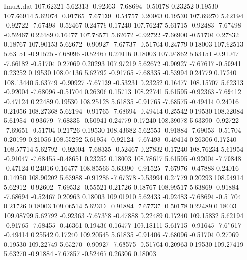 \begin{filecontents}{ImuA.dat}
 107.62321    5.62313   -0.92363   -7.68694   -0.50178    0.23252    0.19530
 107.66914    5.62074   -0.91765   -7.67139   -0.54757    0.20963    0.19530
 107.69270    5.62194   -0.92722   -7.67498   -0.52467    0.24779    0.17240
 107.76247    5.61715   -0.92483   -7.67498   -0.52467    0.22489    0.16477
 107.78571    5.62672   -0.92722   -7.66900   -0.51704    0.27832    0.18767
 107.90153    5.62672   -0.90927   -7.67737   -0.51704    0.24779    0.18003
 107.92513    5.63151   -0.91525   -7.68096   -0.52467    0.24016    0.18003
 107.94862    5.63151   -0.91047   -7.66182   -0.51704    0.27069    0.20293
 107.97219    5.62672   -0.90927   -7.67617   -0.50941    0.23252    0.19530
 108.04136    5.62792   -0.91765   -7.68335   -0.53994    0.24779    0.17240
 108.13440    5.63749   -0.90927   -7.67139   -0.53231    0.23252    0.16477
 108.15707    5.62313   -0.92004   -7.68096   -0.51704    0.26306    0.15713
 108.22741    5.61595   -0.92363   -7.69412   -0.47124    0.22489    0.19530
 108.25128    5.61835   -0.91765   -7.68575   -0.49414    0.24016    0.21056
 108.27368    5.62194   -0.91765   -7.68694   -0.49414    0.25542    0.19530
 108.32084    5.61954   -0.93679   -7.68335   -0.50941    0.24779    0.17240
 108.39078    5.63390   -0.92722   -7.69651   -0.51704    0.21726    0.19530
 108.43682    5.62553   -0.91884   -7.69053   -0.51704    0.20199    0.21056
 108.55292    5.61954   -0.92124   -7.67498   -0.49414    0.26306    0.17240
 108.57714    5.62792   -0.92004   -7.68335   -0.52467    0.27832    0.17240
 108.76234    5.61954   -0.91047   -7.68455   -0.48651    0.23252    0.18003
 108.78617    5.61595   -0.92004   -7.70848   -0.47124    0.24016    0.16477
 108.85566    5.63390   -0.91525   -7.67976   -0.47888    0.24016    0.14950
 108.90202    5.63988   -0.91286   -7.67378   -0.53994    0.24779    0.20293
 108.94914    5.62912   -0.92602   -7.69532   -0.55521    0.21726    0.18767
 108.99517    5.63869   -0.91884   -7.68694   -0.52467    0.20963    0.18003
 109.01910    5.62433   -0.92483   -7.68694   -0.51704    0.21726    0.18003
 109.06514    5.62313   -0.91884   -7.67737   -0.50178    0.22489    0.18003
 109.08799    5.62792   -0.92363   -7.67378   -0.47888    0.22489    0.17240
 109.15832    5.62194   -0.91765   -7.68455   -0.46361    0.19436    0.16477
 109.18111    5.61715   -0.91645   -7.67617   -0.49414    0.25542    0.17240
 109.20545    5.61835   -0.91406   -7.68096   -0.51704    0.27069    0.19530
 109.22749    5.63270   -0.90927   -7.68575   -0.51704    0.20963    0.19530
 109.27419    5.63270   -0.91884   -7.67857   -0.52467    0.26306    0.18003

\end{filecontents}
